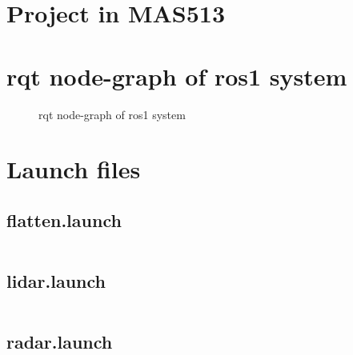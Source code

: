 \appendix

\chapter{Project in MAS513}
\label{Appdix:MAS513}
 

\chapter{rqt node-graph of ros1 system}
\label{Appdix:rqtROS1NB}
\newpage
\begin{figure}[H]

  \caption{rqt node-graph of ros1 system}
  \label{fig:Appdix:rqt:ros1_noBridge}
\end{figure}

\chapter{Launch files}

\section{flatten.launch}
\label{Appdix:flatten.launch}
\inputminted{xml}{ros_system/launch/src/sublaunch/flatten.launch}

\section{lidar.launch}
\label{Appdix:lidar.launch}
\inputminted{xml}{ros_system/launch/src/sublaunch/lidar.launch}

\section{radar.launch}
\label{Appdix:radar.launch}
\inputminted{xml}{ros_system/launch/src/sublaunch/radar.launch}